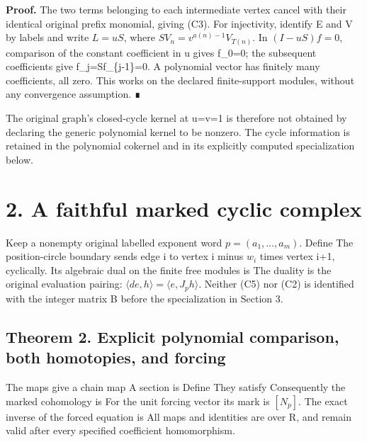 \textbf{Proof.} The two terms belonging to each intermediate vertex
cancel with their identical original prefix monomial, giving (C3). For
injectivity, identify E and V by labels and write \(L=uS\), where
\(S V_n=v^{a(n)-1}V_{T(n)}\). In \((I-uS)f=0\), comparison of the
constant coefficient in u gives f\_0=0; the subsequent coefficients give
f\_j=Sf\_\{j-1\}=0. A polynomial vector has finitely many coefficients,
all zero. This works on the declared finite-support modules, without any
convergence assumption. ∎

The original graph's closed-cycle kernel at u=v=1 is therefore not
obtained by declaring the generic polynomial kernel to be nonzero. The
cycle information is retained in the polynomial cokernel and in its
explicitly computed specialization below.

\section{2. A faithful marked cyclic complex}

Keep a nonempty original labelled exponent word \(p=(a_1,\ldots,a_m)\).
Define 
 The position-circle boundary sends
edge i to vertex i minus \(w_i\) times vertex i+1, cyclically. Its
algebraic dual on the finite free modules is
 The
duality is the original evaluation pairing:
\(\langle d e,h\rangle=\langle e,J_ph\rangle\). Neither (C5) nor (C2) is
identified with the integer matrix B before the specialization in
Section 3.

\subsection{Theorem 2. Explicit polynomial comparison, both homotopies,
and forcing}

The maps
give a chain map
A section is
 Define 
They satisfy
Consequently the marked cohomology is
For the unit forcing vector its mark is \([N_p]\). The exact inverse of
the forced equation is
 All maps and
identities are over R, and remain valid after every specified
coefficient homomorphism.

